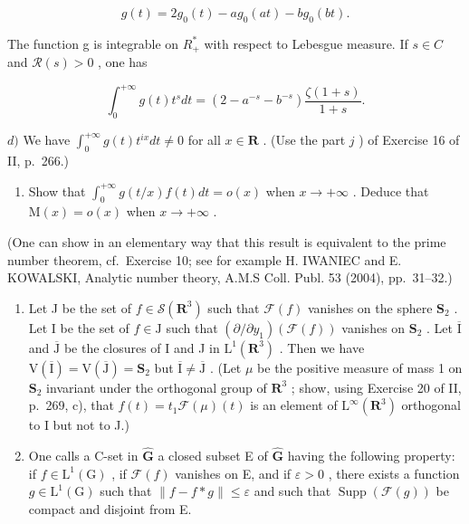 \[
g (t) = 2 g _ {0} (t) - a g _ {0} (a t) - b g _ {0} (b t).
\]

The function g is integrable on \(R_{+}^{*}\) with respect to Lebesgue measure. If \(s \in C\) and \(\mathcal{R}(s) > 0\) , one has

\[
\int_ {0} ^ {+ \infty} g (t) t ^ {s} d t = (2 - a ^ {- s} - b ^ {- s}) \frac {\zeta (1 + s)}{1 + s}.
\]

\(d)\) We have \(\int_{0}^{+\infty} g(t)t^{ix} dt \neq 0\) for all \(x \in \mathbf{R}\) . (Use the part \(j\) ) of Exercise 16 of II, p.~266.)

\begin{enumerate}
\def\labelenumi{\alph{enumi})}
\setcounter{enumi}{4}
\tightlist
\item
  Show that \(\int_0^{+\infty} g(t / x)f(t)dt = o(x)\) when \(x \to +\infty\) . Deduce that \(\mathrm{M}(x) = o(x)\) when \(x \to +\infty\) .
\end{enumerate}

(One can show in an elementary way that this result is equivalent to the prime number theorem, cf.~Exercise 10; see for example H. IWANIEC and E. KOWALSKI, Analytic number theory, A.M.S Coll. Publ. 53 (2004), pp.~31--32.)

\begin{enumerate}
\def\labelenumi{\arabic{enumi})}
\setcounter{enumi}{11}
\item
  Let J be the set of \(f \in \mathcal{S}(\mathbf{R}^3)\) such that \(\mathcal{F}(f)\) vanishes on the sphere \(\mathbf{S}_2\) . Let I be the set of \(f \in \mathrm{J}\) such that \((\partial/\partial y_1)(\mathcal{F}(f))\) vanishes on \(\mathbf{S}_2\) . Let \(\overline{\mathrm{I}}\) and \(\overline{\mathrm{J}}\) be the closures of I and J in \(\mathrm{L}^1(\mathbf{R}^3)\) . Then we have \(\mathrm{V}(\overline{\mathrm{I}}) = \mathrm{V}(\overline{\mathrm{J}}) = \mathbf{S}_2\) but \(\overline{\mathrm{I}} \neq \overline{\mathrm{J}}\) . (Let \(\mu\) be the positive measure of mass 1 on \(\mathbf{S}_2\) invariant under the orthogonal group of \(\mathbf{R}^3\) ; show, using Exercise 20 of II, p.~269, c), that \(f(t) = t_1\mathcal{F}(\mu)(t)\) is an element of \(\mathrm{L}^\infty(\mathbf{R}^3)\) orthogonal to I but not to J.)
\item
  One calls a C-set in \(\widehat{\mathbf{G}}\) a closed subset E of \(\widehat{\mathbf{G}}\) having the following property: if \(f\in \mathrm{L}^{1}(\mathrm{G})\) , if \(\mathcal{F}(f)\) vanishes on E, and if \(\varepsilon >0\) , there exists a function \(g\in \mathrm{L}^{1}(\mathrm{G})\) such that \(\| f - f*g\| \leqslant \varepsilon\) and such that \(\operatorname {Supp}(\mathcal{F}(g))\) be compact and disjoint from E.
\end{enumerate}

